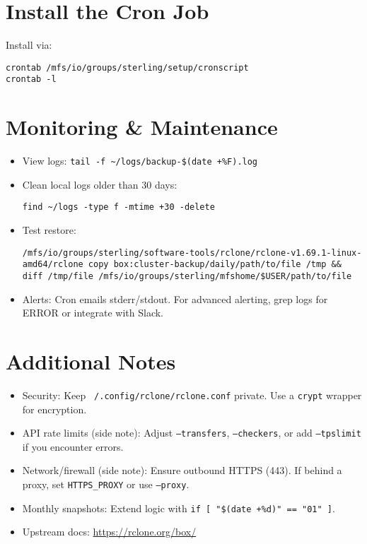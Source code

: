 \documentclass[12pt,letterpaper]{article}
\begin{document}
\section{Install the Cron Job}

Install via:
\begin{lstlisting}[style=custombash]
crontab /mfs/io/groups/sterling/setup/cronscript
crontab -l
\end{lstlisting}

\section{Monitoring \& Maintenance}

\begin{itemize}
  \item View logs: \lstinline!tail -f ~/logs/backup-$(date +%F).log!
  \item Clean local logs older than 30 days:
    \begin{lstlisting}[style=custombash]
find ~/logs -type f -mtime +30 -delete
    \end{lstlisting}
  \item Test restore:
    \begin{lstlisting}[style=custombash]
/mfs/io/groups/sterling/software-tools/rclone/rclone-v1.69.1-linux-amd64/rclone copy box:cluster-backup/daily/path/to/file /tmp && diff /tmp/file /mfs/io/groups/sterling/mfshome/$USER/path/to/file
    \end{lstlisting}
  \item Alerts: Cron emails stderr/stdout. For advanced alerting, grep logs for ERROR or integrate with Slack.
\end{itemize}

\section{Additional Notes}

\begin{itemize}
  \item Security: Keep \texttt{~/.config/rclone/rclone.conf} private. Use a \texttt{crypt} wrapper for encryption.
  \item API rate limits (side note): Adjust \texttt{--transfers}, \texttt{--checkers}, or add \texttt{--tpslimit} if you encounter errors.
  \item Network/firewall (side note): Ensure outbound HTTPS (443). If behind a proxy, set \texttt{HTTPS\_PROXY} or use \texttt{--proxy}.
  \item Monthly snapshots: Extend logic with \lstinline!if [ "$(date +%d)" == "01" ]!.
  \item Upstream docs: \url{https://rclone.org/box/}
\end{itemize}
\end{document}
